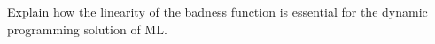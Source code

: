 Explain how the linearity of the badness function is essential for the
dynamic programming solution of ML.
